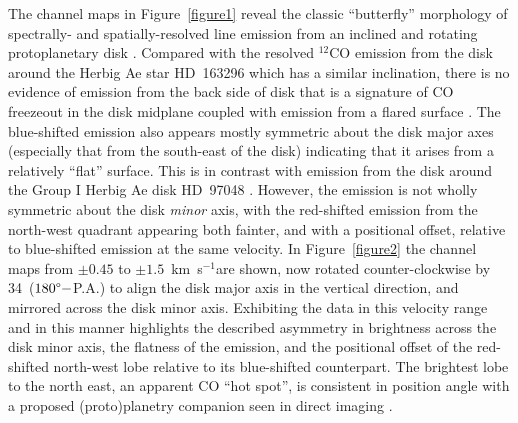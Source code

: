 \documentclass[onecolumn]{aastex6}
\newcommand{\kms}{km~s$^{-1}$}
\begin{document}
The channel maps in Figure~\ref{figure1} reveal the classic ``butterfly'' morphology of 
spectrally- and spatially-resolved line emission from an inclined 
and rotating protoplanetary disk \citep[see, e.g.,][]{semenov08}.  
Compared with the resolved $^{12}$CO emission from 
the disk around the Herbig Ae star HD~163296 which has a similar inclination, 
there is no evidence of emission from the back side of disk that is a 
signature of CO freezeout in the disk midplane coupled with 
emission from a flared surface \citep{degregorio13,rosenfeld13}.
The blue-shifted emission also appears mostly symmetric about the disk major axes  
(especially that from the south-east of the disk) 
indicating that it arises from a relatively ``flat'' surface.   
This is in contrast with emission from the disk around the Group I 
Herbig Ae disk HD~97048 \citep{walsh16,vanderplas17}.  
However, the emission is not wholly symmetric about the disk {\em minor} axis, 
with the red-shifted emission from the north-west quadrant appearing both 
fainter, and with a positional offset, relative to blue-shifted 
emission at the same velocity.  
In Figure~\ref{figure2} the channel maps from $\pm 0.45$ to $\pm 1.5$~\kms are 
shown, now rotated counter-clockwise by 34\degree~($180\degree - $P.A.) to align the disk major axis in the vertical direction, and 
mirrored across the disk minor axis.  
Exhibiting the data in this velocity range and in this manner highlights 
the described asymmetry in brightness across the disk minor axis, the flatness of the emission, and 
the positional offset of the red-shifted north-west lobe relative to 
its blue-shifted counterpart.  
The brightest lobe to the north east, an apparent CO ``hot spot'', is 
consistent in position angle with a proposed (proto)planetry companion 
seen in direct imaging \citep{quanz13,currie15,quanz15,rameau17}.  

% 
\end{document}
